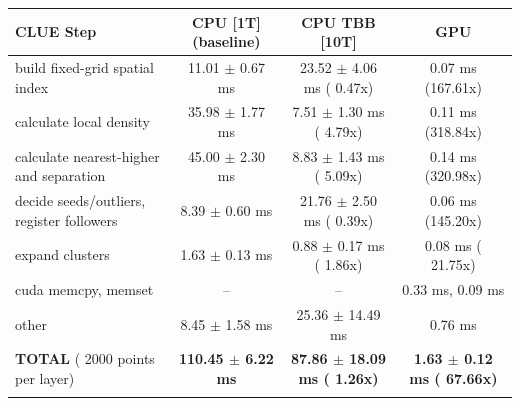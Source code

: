     \begin{tabular}{l|c|c|c}
    \hline
    CLUE Step                                 & CPU [1T] (baseline)         & CPU TBB [10T]                         & GPU                       \\ \hline
    build fixed-grid spatial index            &  11.01 $\pm$  0.67 ms       &  23.52 $\pm$  4.06 ms ( 0.47x)        &   0.07 ms (167.61x)       \\
    calculate local density                   &  35.98 $\pm$  1.77 ms       &   7.51 $\pm$  1.30 ms ( 4.79x)        &   0.11 ms (318.84x)       \\
    calculate nearest-higher and separation   &  45.00 $\pm$  2.30 ms       &   8.83 $\pm$  1.43 ms ( 5.09x)        &   0.14 ms (320.98x)       \\
    decide seeds/outliers, register followers &   8.39 $\pm$  0.60 ms       &  21.76 $\pm$  2.50 ms ( 0.39x)        &   0.06 ms (145.20x)       \\
    expand clusters                           &   1.63 $\pm$  0.13 ms       &   0.88 $\pm$  0.17 ms ( 1.86x)        &   0.08 ms ( 21.75x)       \\ \hline
    cuda memcpy, memset                       & --                          & --                                    &   0.33 ms,   0.09 ms      \\
    other                                     &   8.45 $\pm$  1.58 ms       &  25.36 $\pm$ 14.49 ms                 &   0.76 ms                 \\ \hline
    \textbf{TOTAL} ( 2000 points per layer)   & \textbf{110.45 $\pm$  6.22 ms} & \textbf{ 87.86 $\pm$ 18.09 ms ( 1.26x)} & \textbf{  1.63 $\pm$  0.12 ms ( 67.66x)}  \\
    \hline
    \multicolumn{4}{c}{}
    \end{tabular}
    \linebreak


